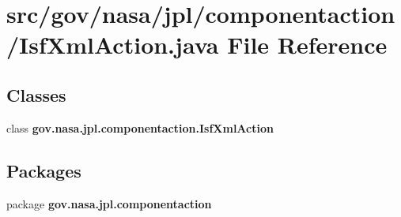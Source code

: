 \section{src/gov/nasa/jpl/componentaction/\+Isf\+Xml\+Action.java File Reference}
\label{_isf_xml_action_8java}
\subsection*{Classes}
\begin{DoxyCompactItemize}
\item 
class {\bf gov.\+nasa.\+jpl.\+componentaction.\+Isf\+Xml\+Action}
\end{DoxyCompactItemize}
\subsection*{Packages}
\begin{DoxyCompactItemize}
\item 
package {\bf gov.\+nasa.\+jpl.\+componentaction}
\end{DoxyCompactItemize}
